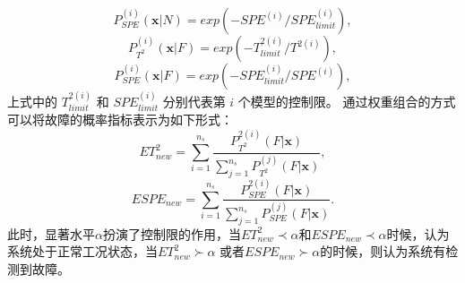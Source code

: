 \begin{equation}\label{}
P^{(i)}_{SPE}(\textbf{x}|N)=exp(-SPE^{(i)}/SPE^{(i)}_{limit}),
\end{equation}
\begin{equation}\label{}
P^{(i)}_{T^2}(\textbf{x}|F)=exp(-T^{2(i)}_{limit}/T^{2(i)}),
\end{equation}
\begin{equation}\label{25}
P^{(i)}_{SPE}(\textbf{x}|F)=exp(-SPE^{(i)}_{limit}/SPE^{(i)}),
\end{equation}
上式中的 $T^{2(i)}_{limit}$ 和 $SPE^{(i)}_{limit}$ 分别代表第 $i$ 个模型的控制限。
通过权重组合的方式可以将故障的概率指标表示为如下形式：
\begin{equation}\label{26}
ET^2_{new}=\sum_{i=1}^{n_s}\frac{P^{2(i)}_{T^2}(F|\textbf{x})}{\sum_{j=1}^{n_s}P^{(j)}_{T^2}(F|\textbf{x})},
\end{equation}
\begin{equation}\label{27}
ESPE_{new}=\sum_{i=1}^{n_s}\frac{P^{2(i)}_{SPE}(F|\textbf{x})}{\sum_{j=1}^{n_s}P^{(j)}_{SPE}(F|\textbf{x})}.
\end{equation}
此时，显著水平$\alpha$扮演了控制限的作用，当$ET^2_{new}\prec\alpha$和$ESPE_{new}\prec\alpha$时候，认为系统处于正常工况状态，当$ET^2_{new}\succ \alpha$ 或者$ESPE_{new}\succ\alpha$的时候，则认为系统有检测到故障。
